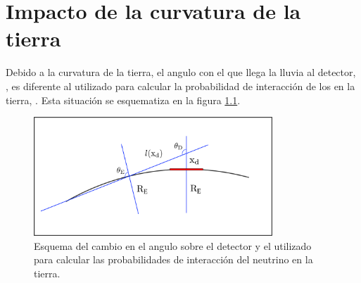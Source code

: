 \chapter{Impacto de la curvatura de la tierra}
\label{ap:tierraCurva}

	
	Debido a la curvatura de la tierra, el angulo con el que llega la lluvia al detector, \td{}, es diferente al utilizado para calcular la probabilidad de interacci\'on de los \nutau{} en la tierra, \te{}.
	Esta situaci\'on se esquematiza en la figura \ref{fig:curveEarthSketch}.
	
	\begin{figure}[ht!]
		\centering
		\includegraphics[width=0.8\textwidth]{./fig/appendix/curveEarthSketch.pdf}
		\caption{\label{fig:curveEarthSketch}
		Esquema del cambio en el angulo sobre el detector y el utilizado para calcular las probabilidades de interacci\'on del neutrino en la tierra.
		}
	\end{figure}
	
